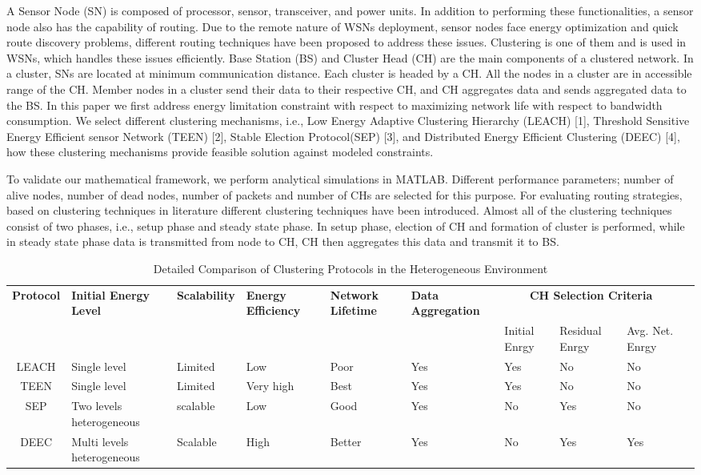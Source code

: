 \documentclass[journal]{IEEEtran}
\begin{document}
{A Sensor Node (SN) is composed of processor, sensor, transceiver, and power units. In addition to performing these functionalities, a sensor node also has the capability of routing. Due to the remote nature of WSNs deployment, sensor nodes face energy optimization and quick route discovery problems, different routing techniques have been proposed to address these issues. Clustering is one of them and is used in WSNs, which handles these issues efficiently.
Base Station (BS) and Cluster Head (CH) are the main components of a clustered network. In a cluster, SNs are located at minimum communication distance. Each cluster is headed by a CH. All the nodes in a cluster are in accessible range of the CH. Member nodes in a cluster send their data to their respective CH, and CH aggregates data and sends aggregated data to the BS. In this paper we first address energy limitation constraint with respect to maximizing network life with respect to bandwidth consumption. We select different clustering mechanisms, i.e., Low Energy Adaptive Clustering Hierarchy (LEACH) [1], Threshold Sensitive Energy Efficient sensor Network (TEEN) [2], Stable Election Protocol(SEP) [3], and Distributed Energy Efficient Clustering (DEEC) [4], how these clustering mechanisms provide feasible solution against modeled constraints.

To validate our mathematical framework, we perform analytical simulations in MATLAB. Different performance parameters; number of alive nodes, number of dead nodes, number of packets and number of CHs are selected for this purpose. For evaluating routing strategies, based on clustering techniques in literature different clustering techniques have been introduced. Almost all of the clustering techniques consist of two phases, i.e., setup phase and steady state phase. In setup phase, election of CH and formation of cluster is performed, while in steady state phase data is transmitted from node to CH, CH then aggregates this data and transmit it to BS.

\begin{table*}[t]
\caption{Detailed Comparison of Clustering Protocols in the Heterogeneous Environment}
\centering
\begin{tabular}{|c|p{1.75cm}|p{1.5cm}|p{1.5cm}|p{1.5cm}|p{1.5cm}|p{1.5cm}|p{1.5cm}|p{1.5cm}|p{1.5cm}|}
\hline\bf{Protocol}&\bf{Initial Energy Level}&\bf{Scalability}&\bf{Energy Efficiency}&\bf{Network Lifetime}&\bf{Data Aggregation}& \multicolumn{3}{|c|}{\bf{CH Selection Criteria}}\\ \cline{7-9} &&&&&& Initial Enrgy& Residual Enrgy& Avg. Net. Enrgy\\ \hline
LEACH&Single level&Limited&Low&Poor&Yes&Yes&No&No \\ \hline
TEEN&Single level&Limited&Very high&Best&Yes&Yes&No&No \\ \hline
SEP& Two levels heterogeneous&scalable&Low&Good&Yes&No&Yes&No \\ \hline
DEEC&Multi levels heterogeneous&Scalable&High&Better&Yes&No&Yes&Yes \\ \hline
\end{tabular}
\end{table*}

}
\end{document}
